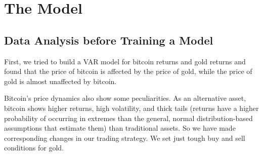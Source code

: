 \documentclass[12pt]{article}
\begin{document}
    \section{The Model}
    
    \subsection{Data Analysis before Training a Model}
    First, we tried to build a VAR model for bitcoin returns and gold returns and found that the price of bitcoin is affected by the price of gold, while the price of gold is almost unaffected by bitcoin.
    
    \begin{figure}[H]
        \centering
        \label{fig:data_analysis}
    \end{figure}
    
    Bitcoin's price dynamics also show some peculiarities.
    As an alternative asset, bitcoin shows higher returns, high volatility, and thick tails (returns have a higher probability of occurring in extremes than the general, normal distribution-based assumptions that estimate them) than traditional assets\cite{beguvsic2018scaling}.
    So we have made corresponding changes in our trading strategy. We set just tough buy and sell conditions for gold.
    
\end{document}
